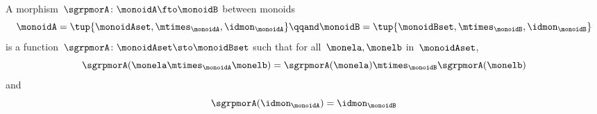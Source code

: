 \begin{ctdefinition}
    \label{def:monoid-mor}
    A morphism~$\sgrpmorA\colon \monoidA \fto \monoidB$ between monoids
    \begin{equation}
        \monoidA = \tup{\monoidAset, \mtimes_\monoidA, \idmon_\monoidA}
        \qqand
        \monoidB = \tup{\monoidBset, \mtimes_\monoidB, \idmon_\monoidB}
    \end{equation}
    is a function~$\sgrpmorA \colon \monoidAset \sto \monoidBset$ such that
    for all~$\monela, \monelb$ in~$\monoidAset$,
    \begin{equation}
        \label{eq:mon-mor-comp}
        \sgrpmorA (\monela \mtimes_{\monoidA} \monelb) = \sgrpmorA (\monela) \mtimes_{\monoidB}  \sgrpmorA(\monelb)
    \end{equation}
    and
    \begin{equation}
        \label{eq:mon-id-comp}
        \sgrpmorA (\idmon_\monoidA) = \idmon_{\monoidB}
    \end{equation}
\end{ctdefinition}
